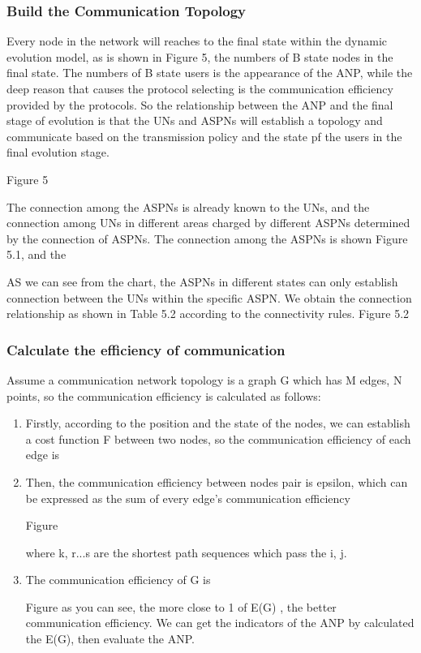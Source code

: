 \documentclass{article}
\begin{document}
\subsubsection{Build the Communication Topology}
Every node in the network will reaches to the final state within the dynamic evolution model, as is shown in Figure 5,
the numbers of B state nodes in the final state. The numbers of B state users is the appearance of the ANP, while the deep reason
that causes the protocol selecting is the communication efficiency provided by the protocols. So the relationship between
the ANP and the final stage of evolution is that the UNs and ASPNs will establish a topology and communicate based on
the transmission policy and the state pf the users in the final evolution stage.

Figure 5

The connection among the ASPNs is already known to the UNs, and the connection among UNs in different areas charged by different
ASPNs determined by the connection of ASPNs. The connection among the ASPNs is shown Figure 5.1, and the

AS we can see from the chart, the ASPNs in different states can only establish connection between the UNs within the specific ASPN.
We obtain the connection relationship as shown in Table 5.2 according to the connectivity rules.
Figure 5.2

\subsubsection{Calculate the efficiency of communication}
Assume a communication network topology is a graph G which has M edges, N points, so the communication efficiency is calculated as follows:
\begin{enumerate}
    \item Firstly,  according to the position and the state of the nodes, we can establish a cost function F between two nodes,
    so the communication efficiency of each edge is
    \item Then, the communication efficiency between nodes pair is epsilon, which can be expressed as the sum of every edge's
    communication efficiency

    Figure

    where k, r...s are the shortest path sequences which pass the i, j.
    \item The communication efficiency of G is

    Figure
    as you can see, the more close to 1 of E(G) , the better communication efficiency. We can get the indicators of the ANP by calculated the E(G), then evaluate the ANP.

\end{enumerate}
\end{document}
